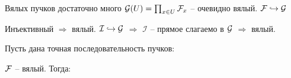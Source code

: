 \documentclass[../main.tex]{subfiles}
\begin{document}
\begin{to_claim}
Вялых пучков достаточно много $\mathcal{G}(U) = \prod_{x \in U} \mathcal{F}_x$ -- очевидно вялый. $\mathcal{F} \hookrightarrow \mathcal{G}$
\end{to_claim}
\begin{to_claim}
Инъективный $\Rightarrow$ вялый. $\mathcal{I} \hookrightarrow \mathcal{G}$ $\Rightarrow$ $\mathcal{I}$ -- прямое слагаемо в $\mathcal{G}$ $\Rightarrow$ вялый.
\end{to_claim}
\begin{to_claim}
Пусть дана точная последовательность пучков:
\bee
{}
\eee
$\mathcal{F}$ -- вялый. Тогда:
\bee
{}
\eee
\end{to_claim}
\end{document}
